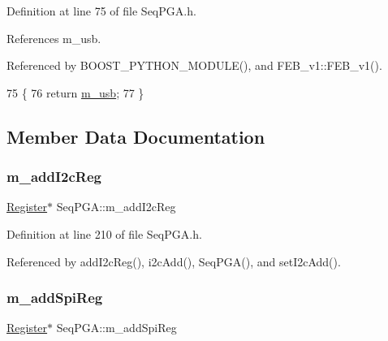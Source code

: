 Definition at line 75 of file Seq\+P\+G\+A.\+h.



References m\+\_\+usb.



Referenced by B\+O\+O\+S\+T\+\_\+\+P\+Y\+T\+H\+O\+N\+\_\+\+M\+O\+D\+U\+L\+E(), and F\+E\+B\+\_\+v1\+::\+F\+E\+B\+\_\+v1().


\begin{DoxyCode}
75                          \{
76     \textcolor{keywordflow}{return} \hyperlink{classSeqPGA_a3df81bbe0e75a1287aa6fe9d33ea27f5}{m\_usb};
77   \}
\end{DoxyCode}


\subsection{Member Data Documentation}
\mbox{\label{classSeqPGA_ac3a6aad3fec65ceb78528b6d20deeb3f}} 
\subsubsection{\texorpdfstring{m\+\_\+add\+I2c\+Reg}{m\_addI2cReg}}
{\footnotesize\ttfamily \hyperlink{classRegister}{Register}$\ast$ Seq\+P\+G\+A\+::m\+\_\+add\+I2c\+Reg\hspace{0.3cm}{\ttfamily [private]}}



Definition at line 210 of file Seq\+P\+G\+A.\+h.



Referenced by add\+I2c\+Reg(), i2c\+Add(), Seq\+P\+G\+A(), and set\+I2c\+Add().

\mbox{\label{classSeqPGA_af31d87ad56c501584ccb9c60776a1289}} 
\subsubsection{\texorpdfstring{m\+\_\+add\+Spi\+Reg}{m\_addSpiReg}}
{\footnotesize\ttfamily \hyperlink{classRegister}{Register}$\ast$ Seq\+P\+G\+A\+::m\+\_\+add\+Spi\+Reg\hspace{0.3cm}{\ttfamily [private]}}



